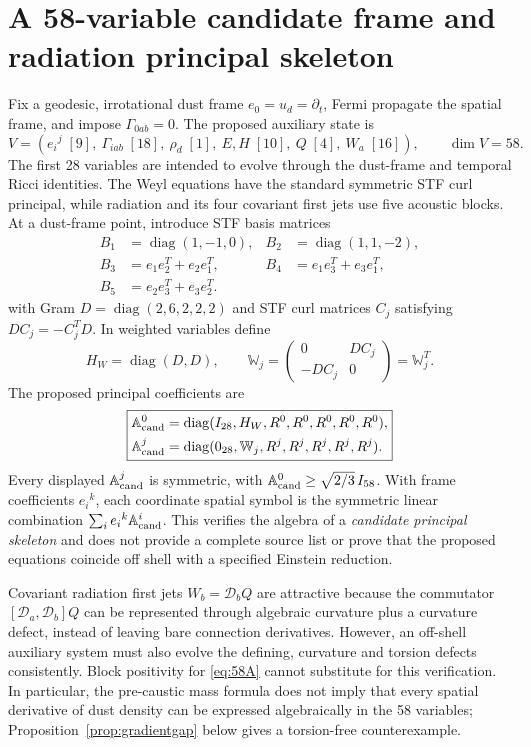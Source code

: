 \documentclass[11pt,a4paper]{article}
\newcommand{\cD}{\mathcal D}
\begin{document}
\section{A 58-variable candidate frame and radiation principal skeleton}
Fix a geodesic, irrotational dust frame $e_0=u_d=\partial_t$, Fermi propagate the spatial frame, and impose $\Gamma_{0ab}=0$. The proposed auxiliary state is
\begin{equation}
V=(e_i{}^j\;[9],\ \Gamma_{iab}\;[18],\ \rho_d\;[1],\ E,H\;[10],\ Q\;[4],\ W_a\;[16]),\qquad \dim V=58.\label{eq:58}
\end{equation}
The first 28 variables are intended to evolve through the dust-frame and temporal Ricci identities. The Weyl equations have the standard symmetric STF curl principal, while radiation and its four covariant first jets use five acoustic blocks. At a dust-frame point, introduce STF basis matrices
\[\begin{aligned}
B_1&=\operatorname{diag}(1,-1,0), & B_2&=\operatorname{diag}(1,1,-2),\\
B_3&=e_1e_2^T+e_2e_1^T, & B_4&=e_1e_3^T+e_3e_1^T,\\
B_5&=e_2e_3^T+e_3e_2^T.
\end{aligned}\]
with Gram $D=\operatorname{diag}(2,6,2,2,2)$ and STF curl matrices $C_j$ satisfying $DC_j=-C_j^TD$. In weighted variables define
\[H_W=\operatorname{diag}(D,D),\qquad
\mathbb W_j=\begin{pmatrix}0&DC_j\\-DC_j&0\end{pmatrix}=\mathbb W_j^T.\]
The proposed principal coefficients are
\begin{equation}\label{eq:58A}
\boxed{\begin{aligned}
\mathbb A^0_{\rm cand}&=\operatorname{diag}(I_{28},H_W,R^0,R^0,R^0,R^0,R^0),\\
\mathbb A^j_{\rm cand}&=\operatorname{diag}(0_{28},\mathbb W_j,R^j,R^j,R^j,R^j,R^j).
\end{aligned}}
\end{equation}
Every displayed $\mathbb A^j_{\rm cand}$ is symmetric, with $\mathbb A^0_{\rm cand}\ge\sqrt{2/3}\,I_{58}$. With frame coefficients $e_i{}^k$, each coordinate spatial symbol is the symmetric linear combination $\sum_i e_i{}^k\mathbb A^i_{\rm cand}$. This verifies the algebra of a \emph{candidate principal skeleton} and does not provide a complete source list or prove that the proposed equations coincide off shell with a specified Einstein reduction.

Covariant radiation first jets $W_b=\cD_bQ$ are attractive because the commutator $[\cD_a,\cD_b]Q$ can be represented through algebraic curvature plus a curvature defect, instead of leaving bare connection derivatives. However, an off-shell auxiliary system must also evolve the defining, curvature and torsion defects consistently. Block positivity for \eqref{eq:58A} cannot substitute for this verification. In particular, the pre-caustic mass formula does not imply that every spatial derivative of dust density can be expressed algebraically in the 58 variables; Proposition~\ref{prop:gradientgap} below gives a torsion-free counterexample.
\end{document}
